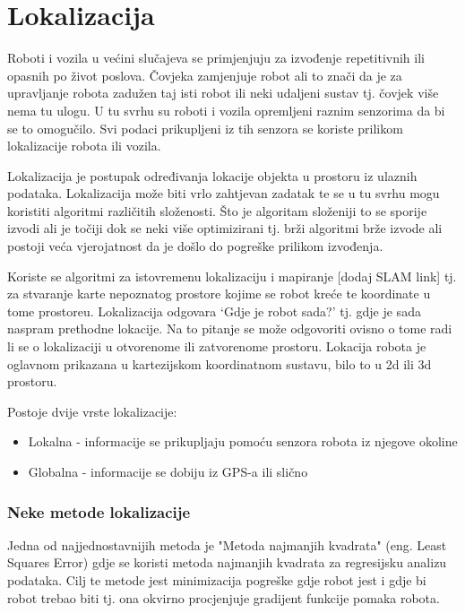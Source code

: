 \section{Lokalizacija}

Roboti i vozila u većini slučajeva se primjenjuju za izvođenje repetitivnih ili opasnih po život poslova. Čovjeka zamjenjuje robot ali to znači da je za upravljanje robota zadužen taj isti robot ili neki udaljeni sustav tj. čovjek više nema tu ulogu. U tu svrhu su roboti i vozila opremljeni raznim senzorima da bi se to omogučilo. Svi podaci prikupljeni iz tih senzora se koriste prilikom lokalizacije robota ili vozila.

Lokalizacija je postupak određivanja lokacije objekta u prostoru iz ulaznih podataka. Lokalizacija može biti vrlo zahtjevan zadatak te se u tu svrhu mogu koristiti algoritmi različitih složenosti. Što je algoritam složeniji to se sporije izvodi ali je točiji dok se neki više optimizirani tj. brži algoritmi brže izvode ali postoji veća vjerojatnost da je došlo do pogreške prilikom izvođenja.

Koriste se algoritmi za istovremenu lokalizaciju i mapiranje [dodaj SLAM link] tj. za stvaranje karte nepoznatog prostore kojime se robot kreće te koordinate u tome prostoreu. Lokalizacija odgovara `Gdje je robot sada?' tj. gdje je sada naspram prethodne lokacije. Na to pitanje se može odgovoriti ovisno o tome radi li se o lokalizaciji u otvorenome ili zatvorenome prostoru. Lokacija robota je oglavnom prikazana u kartezijskom koordinatnom sustavu, bilo to u 2d ili 3d prostoru.

Postoje dvije vrste lokalizacije:

\begin{itemize}
  \item Lokalna - informacije se prikupljaju pomoću senzora robota iz njegove okoline
  \item Globalna - informacije se dobiju iz GPS-a ili slično
\end{itemize}

\newpage
\subsubsection{Neke metode lokalizacije}

Jedna od najjednostavnijih metoda je "Metoda najmanjih kvadrata" (eng. Least Squares Error) gdje se koristi metoda najmanjih kvadrata za regresijsku analizu podataka. Cilj te metode jest minimizacija pogreške gdje robot jest i gdje bi robot trebao biti tj. ona okvirno procjenjuje gradijent funkcije pomaka robota.

